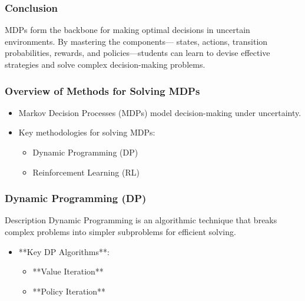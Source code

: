 \documentclass[aspectratio=169]{beamer}
\begin{document}
\begin{frame}[fragile]
    \frametitle{Conclusion}
    MDPs form the backbone for making optimal decisions in uncertain environments. By mastering the components—
    states, actions, transition probabilities, rewards, and policies—students can learn to devise effective strategies and solve complex decision-making problems.
\end{frame}

\begin{frame}[fragile]
    \frametitle{Overview of Methods for Solving MDPs}
    \begin{itemize}
        \item Markov Decision Processes (MDPs) model decision-making under uncertainty.
        \item Key methodologies for solving MDPs:
        \begin{itemize}
            \item Dynamic Programming (DP)
            \item Reinforcement Learning (RL)
        \end{itemize}
    \end{itemize}
\end{frame}

\begin{frame}[fragile]
    \frametitle{Dynamic Programming (DP)}
    \begin{block}{Description}
        Dynamic Programming is an algorithmic technique that breaks complex problems into simpler subproblems for efficient solving.
    \end{block}
    
    \begin{itemize}
        \item **Key DP Algorithms**:
        \begin{itemize}
            \item **Value Iteration**
            \item **Policy Iteration**
        \end{itemize}
    \end{itemize}
\end{frame}
\end{document}

